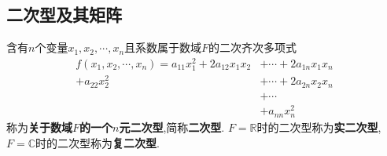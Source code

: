 \documentclass[9pt,a4paper]{book}
\begin{document}
\subsection{二次型及其矩阵}
\begin{defination}[二次型及二次型矩阵的定义]
	含有$ n $个变量$ x_1,x_2,\cdots,x_n $且系数属于数域$ F $的二次齐次多项式
	\begin{align*}
	f( x_1,x_2,\cdots,x_n )=a_{11}x_1^2+2a_{12}x_1x_2&+\cdots+2a_{1n}x_1x_n\\
	+a_{22}x_2^2&+\cdots+2a_{2n}x_2x_n\\
	&+\cdots\\
	&+a_{nn}x_n^2
	\end{align*}
	称为\textbf{关于数域$ F $的一个$ n $元二次型},简称\textbf{二次型}.
	$ F=\mathbb{R} $时的二次型称为\textbf{实二次型},$ F=\mathbb{C} $时的二次型称为\textbf{复二次型}.
	

\end{defination}
\end{document}
